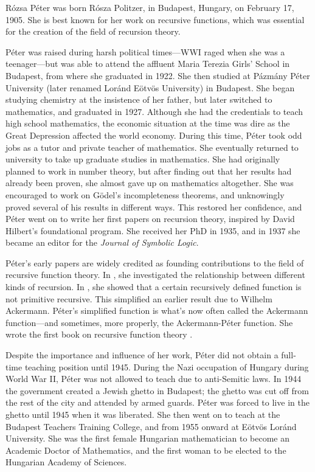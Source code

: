 \documentclass[../../../include/open-logic-section]{subfiles}
\begin{document}


 
R\'ozsa P\'eter was born R\'osza Politzer, in Budapest, Hungary, on
February 17, 1905. She is best known for her work on recursive
functions, which was essential for the creation of the field of
recursion theory.

P\'eter was raised during harsh political times---WWI raged when she
was a teenager---but was able to attend the affluent Maria Terezia
Girls' School in Budapest, from where she graduated in 1922.  She then
studied at P\'azm\'any P\'eter University (later renamed Lor\'and
E\"otv\"os University) in Budapest. She began studying chemistry at
the insistence of her father, but later switched to mathematics, and
graduated in 1927. Although she had the credentials to teach high
school mathematics, the economic situation at the time was dire as the
Great Depression affected the world economy. During this time, P\'eter
took odd jobs as a tutor and private teacher of mathematics. She
eventually returned to university to take up graduate studies in
mathematics.  She had originally planned to work in number theory, but
after finding out that her results had already been proven, she almost
gave up on mathematics altogether. She was encouraged to work on
G\"odel's incompleteness theorems, and unknowingly proved several of
his results in different ways. This restored her confidence, and
P\'eter went on to write her first papers on recursion theory,
inspired by David Hilbert's foundational program. She received her PhD
in 1935, and in 1937 she became an editor for the \emph{Journal of
  Symbolic Logic}.

P\'eter's early papers are widely credited as founding contributions
to the field of recursive function theory. In \cite{Peter1935a}, she
investigated the relationship between different kinds of recursion.
In \cite{Peter1935b}, she showed that a certain recursively defined
function is not primitive recursive. This simplified an earlier result
due to Wilhelm Ackermann. P\'eter's simplified function is what's now
often called the Ackermann function---and sometimes, more properly,
the Ackermann-P\'eter function. She wrote the first book on recursive
function theory \citep{Peter1951}.

Despite the importance and influence of her work, P\'eter did not
obtain a full-time teaching position until 1945. During the Nazi
occupation of Hungary during World War II, P\'eter was not allowed to
teach due to anti-Semitic laws. In 1944 the government created a
Jewish ghetto in Budapest; the ghetto was cut off from the rest of the
city and attended by armed guards. P\'eter was forced to live in the
ghetto until 1945 when it was liberated. She then went on to teach at
the Budapest Teachers Training College, and from 1955 onward at E\"otv\"os
Lor\'and University. She was the first female Hungarian mathematician
to become an Academic Doctor of Mathematics, and the first woman to be
elected to the Hungarian Academy of Sciences.
\end{document}

